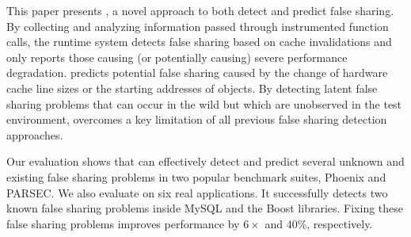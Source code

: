 \label{sec:conclusion}
This paper presents \Predator{}, a novel approach to both detect and predict false sharing. 
By collecting and analyzing information passed through instrumented function calls, the runtime system 
detects false sharing based on cache invalidations and only reports those  
causing (or potentially causing) severe performance degradation.
\Predator{} predicts potential false sharing caused by the change of hardware cache line sizes 
or the starting addresses of objects. By detecting latent false
sharing problems that can occur in the wild but which are unobserved
in the test environment, \Predator{} overcomes a key limitation of
all previous false sharing detection approaches.

Our evaluation shows that \Predator{} can effectively detect and predict several 
unknown and existing false sharing problems 
in two popular benchmark suites, Phoenix and PARSEC. 
We also evaluate \Predator{} on six real applications. 
It successfully detects two known false sharing problems inside MySQL and the Boost libraries.
Fixing these false sharing problems improves performance by $6\times$ and $40\%$, respectively.
